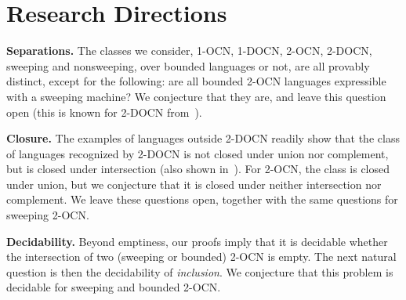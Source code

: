 \documentclass[USenglish]{lipics-v2021}
\newcommand{\shtodo}[1]{\todo[color=cyan!25,size=\small]{SH: #1}}
\newcommand{\mysubparagraph}[1]{\noindent \textbf{\textsf{#1}} }
\begin{document}
\section{Research Directions}
\label{sec:results_directions}
\mysubparagraph{Separations.}  
The classes we consider, 1-OCN, 1-DOCN, 2-OCN,
2-DOCN, sweeping and nonsweeping, over bounded languages or not, are all
provably distinct, except for the following: are all bounded 2-OCN languages
expressible with a sweeping machine?  We conjecture that they are, and leave
this question open (this is known for 2-DOCN from~\cite{chan1987two}).

\mysubparagraph{Closure.}
The examples of languages outside 2-DOCN readily show
that the class of languages recognized by 2-DOCN is not closed under union nor
complement, but is closed under intersection (also shown in~\cite{miyano1982two}). For 2-OCN, the class is closed
under union, but we conjecture that it is closed under neither intersection nor
complement.  We leave these questions open, together with the same questions for
sweeping 2-OCN.

\mysubparagraph{Decidability.}
Beyond emptiness, our proofs imply that it is
decidable whether the intersection of two (sweeping or bounded) 2-OCN is empty.
The next natural question is then the decidability of \emph{inclusion}.  We
conjecture that this problem is decidable for sweeping and bounded 2-OCN.






\end{document}
